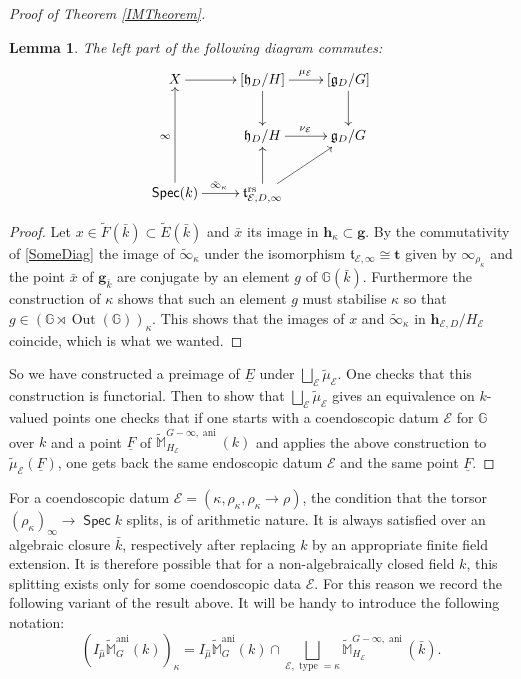 \documentclass{article}
\DeclareMathOperator{\ani}{ani}
\DeclareMathOperator{\Spec}{\mathsf{Spec}}
\newcommand{\BG}{{\mathbb{G}}}
\newcommand{\BM}{{\mathbb{M}}}
\newcommand{\CE}{{\mathcal E}}
\DeclareMathOperator{\Out}{Out}
\theoremstyle{definition}
\theoremstyle{plain}
\newtheorem{lemma}[definition]{Lemma}
\begin{document}
\begin{proof}[Proof of Theorem \ref{IMTheorem}]
\begin{lemma}
The left part of the following diagram commutes:
\begin{equation*}
  \xymatrix{
    X \ar[r] & [\mathfrak{h}_D/H] \ar[r]^{\mu_\CE} \ar[d] & [\mathfrak{g}_D/G]  \ar[d]\\
    & \mathfrak{h}_D/H \ar[r]^{\nu_\CE} & \mathfrak{g}_D/G \\
    \Spec(k)  \ar[uu]^\infty \ar[r]^{\tilde\infty_\kappa} & \mathfrak{t}_{\CE,D,\infty}^{\text{rs}} \ar[ru] \ar[u] &
}
\end{equation*}
\end{lemma}
\begin{proof}
  Let $x\in \tilde F(\bar k) \subset \tilde E(\bar k)$ and $\bar x$ its image in $\mathbf{h}_\kappa \subset \mathbf{g}$. By the commutativity of \eqref{SomeDiag} the image of $\tilde\infty_\kappa$ under the isomorphism $\mathfrak{t}_{\CE,\infty}\cong \mathbf{t}$ given by $\infty_{\rho_\kappa}$ and the point $\bar x$ of $\mathbf{g}_{\bar k}$ are conjugate by an element $g$ of $\BG(\bar k)$. Furthermore the construction of $\kappa$ shows that such an element $g$ must stabilise $\kappa$ so that $g \in (\BG \rtimes \Out(\BG))_\kappa$. This shows that the images of $x$ and $\tilde\infty_\kappa$ in $\mathbf{h}_{\CE,D}/H_\CE$ coincide, which is what we wanted.
\end{proof}
So we have constructed a preimage of $\underline E$ under $\bigsqcup_{\CE}\tilde \mu_\CE$. One checks that this construction is functorial. Then to show that $\bigsqcup_{\CE}\tilde \mu_\CE$ gives an equivalence on $k$-valued points one checks that if one starts with a coendoscopic datum $\CE$ for $\BG$ over $k$ and a point $\underline F$ of $\widetilde \BM^{G-\infty,\ani}_{H_\CE}(k)$ and applies the above construction to $\tilde\mu_\CE(\underline F)$, one gets back the same endoscopic datum $\CE$ and the same point $\underline F$.
\end{proof}


For a coendoscopic datum $\CE = (\kappa,\rho_{\kappa},\rho_{\kappa} \to \rho)$, the condition that the torsor $(\rho_{\kappa})_{\infty} \to \Spec k$ splits, is of arithmetic nature. It is always satisfied over an algebraic closure $\bar{k}$, respectively after replacing $k$ by an appropriate finite field extension. It is therefore possible that for a non-algebraically closed field $k$, this splitting exists only for some coendoscopic data $\CE$. For this reason we record the following variant of the result above. It will be handy to introduce the following notation:
$$\left(I_{\hat\mu}\widetilde{\BM}^{\ani}_G(k)\right)_{\kappa} = I_{\hat\mu}\widetilde{\BM}^{\ani}_G(k) \cap \bigsqcup_{\CE,\text{ type }=\kappa}\widetilde{\BM}^{G-\infty,\ani}_{H_\CE}(\bar{k}).$$
\end{document}
